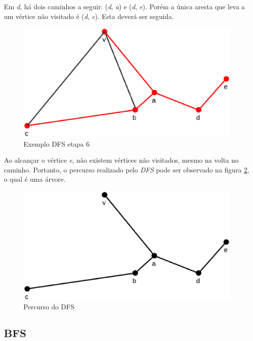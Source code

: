 \begin{apendicesenv}
Em \textit{d}, há dois caminhos a seguir: (\textit{d}, \textit{a}) e (\textit{d}, \textit{e}). Porém a única aresta que leva a um vértice não visitado é (\textit{d}, \textit{e}). Esta deverá ser seguida.

\begin{figure}[!h]
	\centering
	\includegraphics[scale=0.25]{figuras/capitulo2/dfs/dfs6.eps}
	\caption[Exemplo DFS etapa 6]{Exemplo DFS etapa 6 \cite{Cormen:2001}}
	\label{dfs6}
\end{figure}

Ao alcançar o vértice \textit{e}, não existem vértices não visitados, mesmo na volta no caminho. Portanto, o percurso realizado pelo \textit{DFS} pode ser observado na figura \ref{dfs_percurso}, o qual é uma árvore.

\begin{figure}[!h]
	\centering
	\includegraphics[scale=0.25]{figuras/capitulo2/dfs/dfs_percurso.eps}
	\caption[Percurso do DFS]{Percurso do DFS \cite{Cormen:2001}}
	\label{dfs_percurso}
\end{figure}

\subsection{BFS}
\label{subsec:bfs}


\end{apendicesenv}
